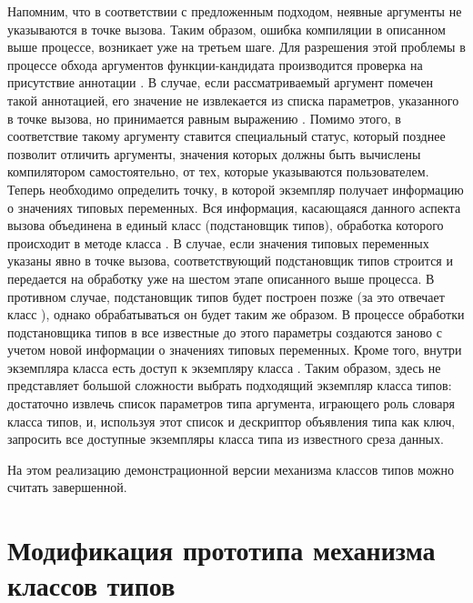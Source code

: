 Напомним, что в соответствии с предложенным подходом, неявные аргументы не указываются в точке вызова. Таким образом, ошибка компиляции в описанном выше процессе, возникает уже на третьем шаге. Для разрешения этой проблемы в процессе обхода аргументов функции-кандидата производится проверка на присутствие аннотации . В случае, если рассматриваемый аргумент помечен такой аннотацией, его значение не извлекается из списка параметров, указанного в точке вызова, но принимается равным выражению . Помимо этого, в соответствие такому аргументу ставится специальный статус, который позднее позволит отличить аргументы, значения которых должны быть вычислены компилятором самостоятельно, от тех, которые указываются пользователем. Теперь необходимо определить точку, в которой экземпляр  получает информацию о значениях типовых переменных. Вся информация, касающаяся данного аспекта вызова объединена в единый класс  (подстановщик типов), обработка которого происходит в методе  класса . В случае, если значения типовых переменных указаны явно в точке вызова, соответствующий подстановщик типов строится и передается на обработку уже на шестом этапе описанного выше процесса. В противном случае, подстановщик типов будет построен позже (за это отвечает класс ), однако обрабатываться он будет таким же образом. В процессе обработки подстановщика типов в  все известные до этого параметры создаются заново с учетом новой информации о значениях типовых переменных. Кроме того, внутри экземпляра класса  есть доступ к экземпляру класса . Таким образом, здесь не представляет большой сложности выбрать подходящий экземпляр класса типов: достаточно извлечь список параметров типа аргумента, играющего роль словаря класса типов, и, используя этот список и дескриптор объявления типа как ключ, запросить все доступные экземпляры класса типа из известного среза данных.    

На этом реализацию демонстрационной версии механизма классов типов можно считать завершенной. 

\section{Модификация прототипа механизма классов типов}



